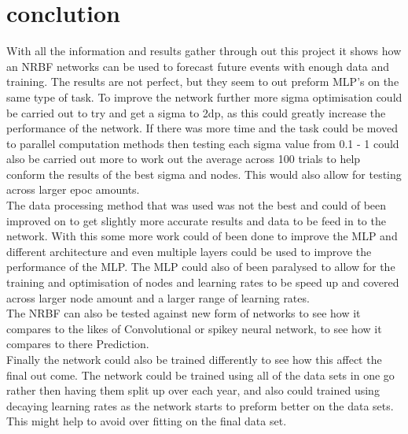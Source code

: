 \documentclass{IEEEtran}[11pt]
\begin{document}
\section{conclution}
\begin{flushleft}
  With all the information and results gather through out this project it shows
  how an NRBF networks can be used to forecast future events with enough data and
  training. The results are not perfect, but they seem to out preform MLP's on the
  same type of task. To improve the network further more sigma optimisation
  could be carried out to try and get a sigma to 2dp, as this could greatly increase
  the performance of the network. If there was more time and the task could be
  moved to parallel computation methods then testing each sigma value from 0.1
  - 1 could also be carried out more to work out the average across 100 trials to
  help conform the results of the best sigma and nodes. This would also allow
  for testing across larger epoc amounts.
  \\
  \vspace{1.5mm}
  The data processing method that was used was not the best and could of been
  improved on to get slightly more accurate results and data to be feed in to
  the network. With this some more work could of been done to improve the MLP
  and different architecture and even multiple layers could be used to improve
  the performance of the MLP. The MLP could also of been paralysed to allow for
  the training and optimisation of nodes and learning rates to be speed up and
  covered across larger node amount and a larger range of learning rates.
  \\
  \vspace{1.5mm}
  The NRBF can also be tested against new form of
  networks to see how it compares to the likes of Convolutional or spikey
  neural network, to see how it compares to there Prediction.
  \\
  \vspace{1.5mm}
  Finally the network could also be trained differently to see how this affect
  the final out come. The network could be trained using all of the data sets
  in one go rather then having them split up over each year, and also could
  trained using decaying learning rates as the network starts to preform better
  on the data sets. This might help to avoid over fitting on the final data set.
\end{flushleft}
\end{document}
